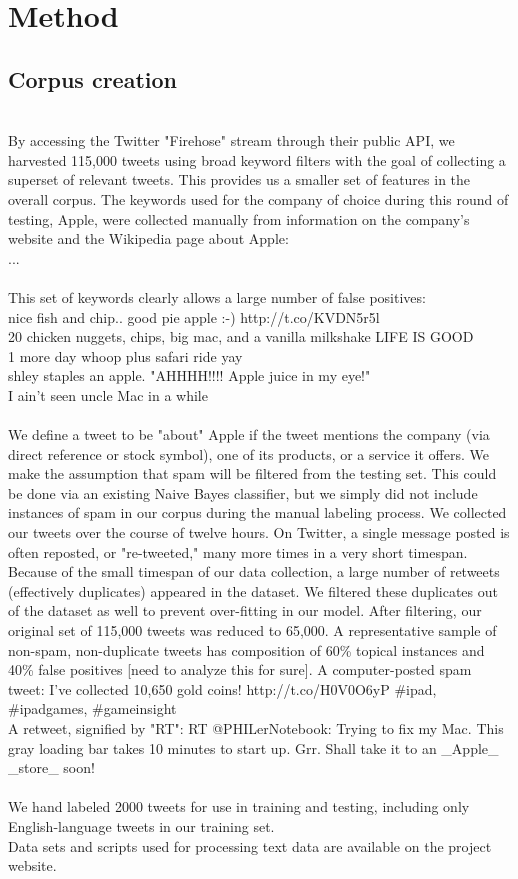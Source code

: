 \documentclass[letterpaper]{article}
\begin{document}
\section{Method}
\subsection{Corpus creation}\\
By accessing the Twitter "Firehose" stream through their public API, we harvested 115,000 tweets using broad keyword filters with the goal of collecting a superset of relevant tweets. This provides us a smaller set of features in the overall corpus. The keywords used for the company of choice during this round of testing, Apple, were collected manually from information on the company's website and the Wikipedia page about Apple:\\
...\\
\\
This set of keywords clearly allows a large number of false positives:\\
nice fish and chip.. good pie apple :-) http://t.co/KVDN5r5l \\
20 chicken nuggets, chips, big mac, and a vanilla milkshake LIFE IS GOOD \\
1 more day whoop plus safari ride yay \\
shley staples an apple.  "AHHHH!!!!  Apple juice in my eye!" \\
I ain't seen uncle Mac in a while\\
\\
We define a tweet to be "about" Apple if the tweet mentions the company (via direct reference or stock symbol), one of its products, or a service it offers. We make the assumption that spam will be filtered from the testing set. This could be done via an existing Naive Bayes classifier, but we simply did not include instances of spam in our corpus during the manual labeling process. We collected our tweets over the course of twelve hours. On Twitter, a single message posted is often reposted, or "re-tweeted," many more times in a very short timespan. Because of the small timespan of our data collection, a large number of retweets (effectively duplicates) appeared in the dataset. We filtered these duplicates out of the dataset as well to prevent over-fitting in our model. After filtering, our original set of 115,000 tweets was reduced to 65,000. A representative sample of non-spam, non-duplicate tweets has composition of 60\% topical instances and 40\% false positives [need to analyze this for sure].
A computer-posted spam tweet: I've collected 10,650 gold coins! http://t.co/H0V0O6yP #ipad, #ipadgames, #gameinsight\\
A retweet, signified by "RT": RT @PHILerNotebook: Trying to fix my Mac. This gray loading bar takes 10 minutes to start up. Grr. Shall take it to an _Apple_ _store_ soon! \\
\\
We hand labeled 2000 tweets for use in training and testing, including only English-language tweets in our training set. \\
Data sets and scripts used for processing text data are available on the project website.
\end{document}

